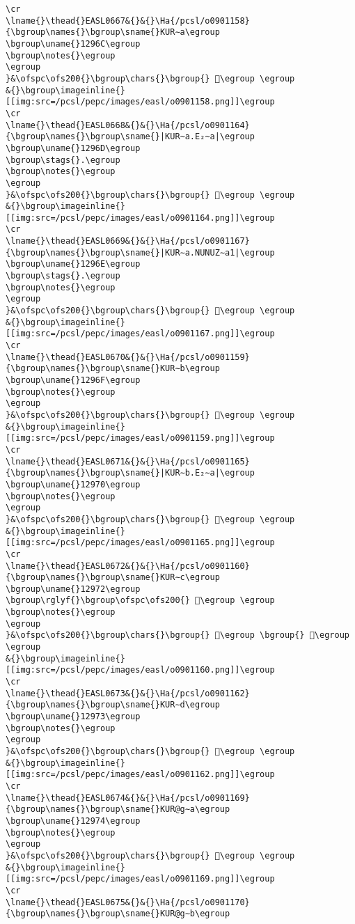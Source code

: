 \begin{verbatim}
\cr
\lname{}\thead{}EASL0667&{}&{}\Ha{/pcsl/o0901158}{\bgroup\names{}\bgroup\sname{}KUR∼a\egroup
\bgroup\uname{}1296C\egroup
\bgroup\notes{}\egroup
\egroup
}&\ofspc\ofs200{}\bgroup\chars{}\bgroup{} 𒥬\egroup \egroup
&{}\bgroup\imageinline{}[[img:src=/pcsl/pepc/images/easl/o0901158.png]]\egroup
\cr
\lname{}\thead{}EASL0668&{}&{}\Ha{/pcsl/o0901164}{\bgroup\names{}\bgroup\sname{}|KUR∼a.E₂∼a|\egroup
\bgroup\uname{}1296D\egroup
\bgroup\stags{}.\egroup
\bgroup\notes{}\egroup
\egroup
}&\ofspc\ofs200{}\bgroup\chars{}\bgroup{} 𒥭\egroup \egroup
&{}\bgroup\imageinline{}[[img:src=/pcsl/pepc/images/easl/o0901164.png]]\egroup
\cr
\lname{}\thead{}EASL0669&{}&{}\Ha{/pcsl/o0901167}{\bgroup\names{}\bgroup\sname{}|KUR∼a.NUNUZ∼a1|\egroup
\bgroup\uname{}1296E\egroup
\bgroup\stags{}.\egroup
\bgroup\notes{}\egroup
\egroup
}&\ofspc\ofs200{}\bgroup\chars{}\bgroup{} 𒥮\egroup \egroup
&{}\bgroup\imageinline{}[[img:src=/pcsl/pepc/images/easl/o0901167.png]]\egroup
\cr
\lname{}\thead{}EASL0670&{}&{}\Ha{/pcsl/o0901159}{\bgroup\names{}\bgroup\sname{}KUR∼b\egroup
\bgroup\uname{}1296F\egroup
\bgroup\notes{}\egroup
\egroup
}&\ofspc\ofs200{}\bgroup\chars{}\bgroup{} 𒥯\egroup \egroup
&{}\bgroup\imageinline{}[[img:src=/pcsl/pepc/images/easl/o0901159.png]]\egroup
\cr
\lname{}\thead{}EASL0671&{}&{}\Ha{/pcsl/o0901165}{\bgroup\names{}\bgroup\sname{}|KUR∼b.E₂∼a|\egroup
\bgroup\uname{}12970\egroup
\bgroup\notes{}\egroup
\egroup
}&\ofspc\ofs200{}\bgroup\chars{}\bgroup{} 𒥰\egroup \egroup
&{}\bgroup\imageinline{}[[img:src=/pcsl/pepc/images/easl/o0901165.png]]\egroup
\cr
\lname{}\thead{}EASL0672&{}&{}\Ha{/pcsl/o0901160}{\bgroup\names{}\bgroup\sname{}KUR∼c\egroup
\bgroup\uname{}12972\egroup
\bgroup\rglyf{}\bgroup\ofspc\ofs200{} 𒥲\egroup \egroup
\bgroup\notes{}\egroup
\egroup
}&\ofspc\ofs200{}\bgroup\chars{}\bgroup{} 𒥱\egroup \bgroup{} 𒥲\egroup \egroup
&{}\bgroup\imageinline{}[[img:src=/pcsl/pepc/images/easl/o0901160.png]]\egroup
\cr
\lname{}\thead{}EASL0673&{}&{}\Ha{/pcsl/o0901162}{\bgroup\names{}\bgroup\sname{}KUR∼d\egroup
\bgroup\uname{}12973\egroup
\bgroup\notes{}\egroup
\egroup
}&\ofspc\ofs200{}\bgroup\chars{}\bgroup{} 𒥳\egroup \egroup
&{}\bgroup\imageinline{}[[img:src=/pcsl/pepc/images/easl/o0901162.png]]\egroup
\cr
\lname{}\thead{}EASL0674&{}&{}\Ha{/pcsl/o0901169}{\bgroup\names{}\bgroup\sname{}KUR@g∼a\egroup
\bgroup\uname{}12974\egroup
\bgroup\notes{}\egroup
\egroup
}&\ofspc\ofs200{}\bgroup\chars{}\bgroup{} 𒥴\egroup \egroup
&{}\bgroup\imageinline{}[[img:src=/pcsl/pepc/images/easl/o0901169.png]]\egroup
\cr
\lname{}\thead{}EASL0675&{}&{}\Ha{/pcsl/o0901170}{\bgroup\names{}\bgroup\sname{}KUR@g∼b\egroup

\end{verbatim}
